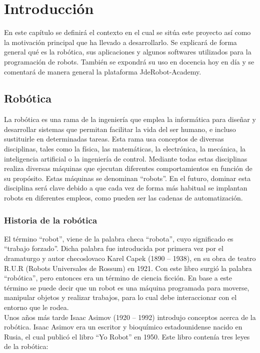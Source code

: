 \chapter{Introducción}\label{cap.introduccion}
En este capítulo se definirá el contexto en el cual se sitúa este proyecto así como la motivación principal que ha llevado a desarrollarlo. Se explicará de forma general qué es la robótica, sus aplicaciones y algunos softwares utilizados para la programación de robots. También se expondrá su uso en docencia hoy en día y se comentará de manera general la plataforma JdeRobot-Academy.

\section{Robótica}
La robótica es una rama de la ingeniería que emplea la informática para diseñar y desarrollar sistemas que permitan facilitar la vida del ser humano, e incluso sustituirle en determinadas tareas. Esta rama usa conceptos de diversas disciplinas, tales como la física, las matemáticas, la electrónica, la mecánica, la inteligencia artificial o la ingeniería de control. Mediante todas estas disciplinas realiza diversas máquinas que ejecutan diferentes comportamientos en función de su propósito. Estas máquinas se denominan ``robots''. En el futuro, dominar esta disciplina será clave debido a que cada vez de forma más habitual se implantan robots en diferentes empleos, como pueden ser las cadenas de automatización. \\

\subsection{Historia de la robótica}
El término ``robot'', viene de la palabra checa ``robota'', cuyo significado es ``trabajo forzado''. Dicha palabra fue introducida por primera vez por el dramaturgo y autor checoslovaco Karel Capek (1890 – 1938), en su obra de teatro R.U.R (Robots Universales de Rossum) en 1921. Con este libro surgió la palabra ``robótica'', pero entonces era un término de ciencia ficción. En base a este término se puede decir que un robot es una máquina programada para moverse, manipular objetos y realizar trabajos, para lo cual debe interaccionar con el entorno que le rodea.\\

Unos años más tarde Isaac Asimov (1920 – 1992) introdujo conceptos acerca de la robótica. Isaac Asimov era un escritor y bioquímico estadounidense nacido en Rusia, el cual publicó el libro ``Yo Robot'' en 1950. Este libro contenía tres leyes de la robótica:

